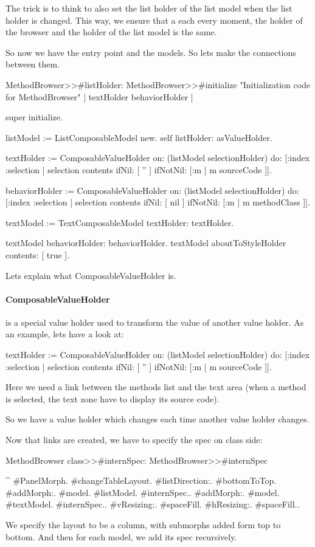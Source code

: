 \documentclass[a4paper,10pt,twoside]{book}
\begin{document}
The trick is to think to also set the list holder of the list model when the list holder is changed. This way, we ensure that a each every moment, the holder of the browser and the holder of the list model is the same.

So now we have the entry point and the models. So lets make the connections between them.

\begin{method}{MethodBrowser>>\#listHolder:}
MethodBrowser>>#initialize
	"Initialization code for MethodBrowser"
	| textHolder behaviorHolder |
	
	super initialize.

	listModel := ListComposableModel new.
	self listHolder: {} asValueHolder.
	
	textHolder := ComposableValueHolder on: (listModel selectionHolder) do: [:index :selection | selection contents 
		ifNil: [ '' ]
		ifNotNil: [:m | m sourceCode ]].
	
	behaviorHolder := ComposableValueHolder on: (listModel selectionHolder) do: [:index :selection | selection contents 
		ifNil: [ nil ]
		ifNotNil: [:m | m methodClass ]].
	
	textModel := TextComposableModel textHolder: textHolder.

	textModel behaviorHolder: behaviorHolder.
	textModel aboutToStyleHolder contents: [ true ].
\end{method}
Lets explain what ComposableValueHolder is.

\paragraph{ComposableValueHolder} is a special value holder used to transform the value of another value holder. As an example, lets have a look at: 
\begin{code}{}
textHolder := ComposableValueHolder on: (listModel selectionHolder) do: [:index :selection | selection contents 
		ifNil: [ '' ]
		ifNotNil: [:m | m sourceCode ]].
\end{code}

Here we need a link between the methods list and the text area (when a method is selected, the text zone have to display its source code).

So we have a value holder which changes each time another value holder changes.

Now that links are created, we have to specify the spec on class side:

\begin{method}{MethodBrowser class>>\#internSpec:}
MethodBrowser>>#internSpec

	^{ #PanelMorph.
			#changeTableLayout.
			#listDirection:. #bottomToTop.
			#addMorph:. {#model. #listModel. #internSpec.}.
			#addMorph:. {#model. #textModel. #internSpec.}.
			#vResizing:. #spaceFill.
			#hResizing:. #spaceFill.}.
\end{method}
We specify the layout to be a column, with submorphs added form top to bottom.
And then for each model, we add its spec recursively.
\end{document}
